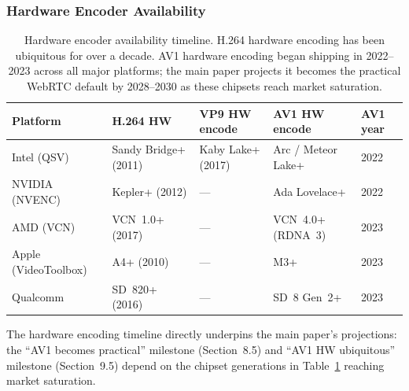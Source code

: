 \subsubsection{Hardware Encoder Availability}

\begin{table}[ht]
\centering
\small
\renewcommand{\arraystretch}{1.4}
\begin{tabularx}{\textwidth}{lXXXX}
\toprule
\textbf{Platform} & \textbf{H.264 HW} & \textbf{VP9 HW encode}
  & \textbf{AV1 HW encode} & \textbf{AV1 year} \\
\midrule
Intel (QSV) &
  Sandy Bridge+ (2011) &
  Kaby Lake+ (2017) &
  Arc / Meteor Lake+ &
  2022 \\
NVIDIA (NVENC) &
  Kepler+ (2012) &
  --- &
  Ada Lovelace+ &
  2022 \\
AMD (VCN) &
  VCN~1.0+ (2017) &
  --- &
  VCN~4.0+ (RDNA~3) &
  2023 \\
Apple (VideoToolbox) &
  A4+ (2010) &
  --- &
  M3+ &
  2023 \\
Qualcomm &
  SD~820+ (2016) &
  --- &
  SD~8 Gen~2+ &
  2023 \\
\bottomrule
\end{tabularx}
\caption{Hardware encoder availability timeline. H.264 hardware encoding
  has been ubiquitous for over a decade. AV1 hardware encoding began
  shipping in 2022--2023 across all major platforms; the main paper projects
  it becomes the practical WebRTC default by 2028--2030 as these chipsets
  reach market saturation.}
\label{tab:hw-encoders}
\end{table}


The hardware encoding timeline directly underpins the main paper's
projections: the ``AV1 becomes practical'' milestone (Section~8.5) and
``AV1 HW ubiquitous'' milestone (Section~9.5) depend on the chipset
generations in Table~\ref{tab:hw-encoders} reaching market saturation.

